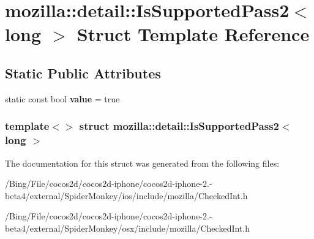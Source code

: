 \hypertarget{structmozilla_1_1detail_1_1_is_supported_pass2_3_01long_01_4}{\section{mozilla\-:\-:detail\-:\-:Is\-Supported\-Pass2$<$ long $>$ Struct Template Reference}
\label{structmozilla_1_1detail_1_1_is_supported_pass2_3_01long_01_4}
}
\subsection*{Static Public Attributes}
\begin{DoxyCompactItemize}
\item 
\hypertarget{structmozilla_1_1detail_1_1_is_supported_pass2_3_01long_01_4_aaf3445234840f72ac4541644232a93c9}{static const bool {\bfseries value} = true}\label{structmozilla_1_1detail_1_1_is_supported_pass2_3_01long_01_4_aaf3445234840f72ac4541644232a93c9}

\end{DoxyCompactItemize}
\subsubsection*{template$<$$>$ struct mozilla\-::detail\-::\-Is\-Supported\-Pass2$<$ long $>$}



The documentation for this struct was generated from the following files\-:\begin{DoxyCompactItemize}
\item 
/\-Bing/\-File/cocos2d/cocos2d-\/iphone/cocos2d-\/iphone-\/2.-\/beta4/external/\-Spider\-Monkey/ios/include/mozilla/Checked\-Int.\-h\item 
/\-Bing/\-File/cocos2d/cocos2d-\/iphone/cocos2d-\/iphone-\/2.-\/beta4/external/\-Spider\-Monkey/osx/include/mozilla/Checked\-Int.\-h\end{DoxyCompactItemize}
